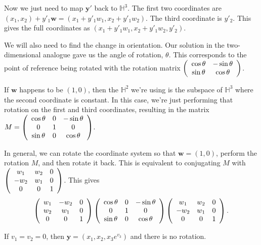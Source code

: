 
Now we just need to map $\textbf{y}'$ back to $\mathbb{H}^3$. The first two coordinates are $(x_1,x_2) + y'_1\textbf{w} = (x_1+y'_1w_1,x_2+y'_1w_2)$. The third coordinate is $y'_2$. This gives the full coordinates as $(x_1+y'_1w_1,x_2+y'_1w_2,y'_2)$.

We will also need to find the change in orientation. Our solution in the two-dimensional analogue gave us the angle of rotation, $\theta$. This corresponds to the point of reference being rotated with the rotation matrix $\left(\begin{array}{ccc} \cos\theta & -\sin\theta \\\sin\theta & \cos\theta \end{array} \right)$.

If $\textbf{w}$ happens to be $(1,0)$, then the $\mathbb{H}^2$ we're using is the subspace of $\mathbb{H}^3$ where the second coordinate is constant. In this case, we're just performing that rotation on the first and third coordinates, resulting in the matrix $M = \left(\begin{array}{ccc} \cos\theta & 0 & -\sin\theta \\0 & 1 & 0 \\\sin\theta & 0 & \cos\theta \end{array} \right)$.

In general, we can rotate the coordinate system so that $\textbf{w} = (1,0)$, perform the rotation $M$, and then rotate it back. This is equivalent to conjugating $M$ with $\left(\begin{array}{ccc} w_1 & w_2 & 0 \\-w_2 & w_1 & 0 \\0 & 0 & 1 \end{array} \right)$. This gives $$\left(\begin{array}{ccc} w_1 & -w_2 & 0 \\w_2 & w_1 & 0 \\0 & 0 & 1 \end{array} \right) \left(\begin{array}{ccc} \cos\theta & 0 & -\sin\theta \\0 & 1 & 0 \\\sin\theta & 0 & \cos\theta \end{array} \right) \left(\begin{array}{ccc} w_1 & w_2 & 0 \\-w_2 & w_1 & 0 \\0 & 0 & 1 \end{array} \right).$$



If $v_1 = v_2 = 0$, then $\textbf{y} = (x_1,x_2,x_3 e^{v_3})$ and there is no rotation.